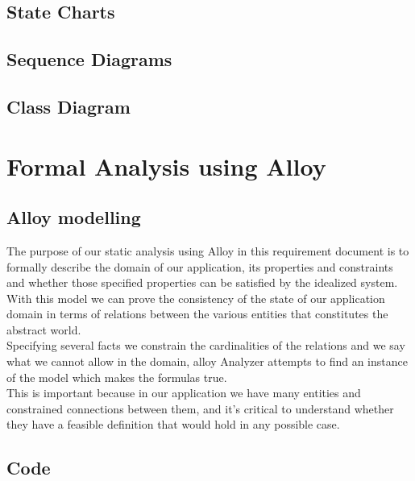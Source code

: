 \documentclass{article}
\begin{document}
\clearpage
\subsection{State Charts}


\clearpage
\subsection{Sequence Diagrams}


\clearpage
\subsection{Class Diagram}



\clearpage
\section{Formal Analysis using Alloy}

\subsection{Alloy modelling}

The purpose of our static analysis using Alloy in this requirement document is to formally describe the domain of our application, its properties and constraints and whether those specified properties can be satisfied by the idealized system.
\\With this model we can prove the consistency of the state of our application domain in terms of relations between the various entities that constitutes the abstract world. 
\\Specifying several facts we constrain the cardinalities of the relations and we say what we cannot allow in the domain, alloy Analyzer attempts to find an instance of the model which makes the formulas true.
\\This is important because in our application we have many entities and constrained connections between them, and it's critical to understand whether they have a feasible definition that would hold in any possible case.







\subsection{Code}
\end{document}
